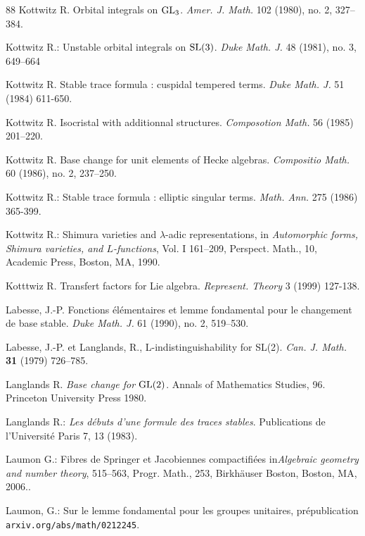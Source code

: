 \documentclass[12pt,english]{smfart}
\numberwithin{equation}{subsection}
\theoremstyle{remark}
\begin{document}
\begin{thebibliography}{88}
 Kottwitz R. Orbital integrals on ${\rm GL}\sb{3}$.
{\em Amer. J. Math.}  102  (1980), no. 2, 327--384.

 Kottwitz R.: {Unstable orbital integrals on ${\rm SL}(3)$}.
{\em Duke Math. J.} 48 (1981), no. 3, 649--664

 Kottwitz R. {Stable trace formula : cuspidal
tempered terms}. {\em Duke Math. J.} 51 (1984) 611-650.

 Kottwitz R. {Isocristal with additionnal
structures}. {\em Composotion Math.} 56 (1985) 201--220.

 Kottwitz R. {Base change for unit elements of Hecke algebras}.
{\em Compositio Math.} 60 (1986), no. 2, 237--250.

 Kottwitz R.: {Stable trace formula : elliptic
singular terms}. {\em Math. Ann.} 275 (1986) 365-399.

 Kottwitz R.: {Shimura varieties and $\lambda$-adic
representations}, in  {\em Automorphic forms, Shimura varieties, and
$L$-functions}, Vol. I 161--209, Perspect. Math., 10, Academic
Press, Boston, MA, 1990.

 Kotttwiz R. {Transfert factors for Lie algebra}.
{\em Represent. Theory} 3 (1999) 127-138.

 Labesse, J.-P. Fonctions \'el\'ementaires et lemme
    fondamental pour le changement de base stable. {\em Duke Math. J.}  61
    (1990),  no. 2, 519--530.

 Labesse, J.-P. et Langlands, R.,
{L-indistinguishability for SL(2)}. \emph{Can. J. Math.} \textbf{31}
(1979) 726--785.

 Langlands R. {\em Base change for ${\rm GL}(2)$}.
Annals of Mathematics Studies, 96. Princeton University Press 1980.

 Langlands R.: {\em Les d\'ebuts d'une formule des
    traces stables}. {Publications de l'Universit\'e Paris 7}, 13 (1983).

 Laumon G.: {Fibres de Springer et Jacobiennes compactifi\'ees}
    in{\em Algebraic geometry and number theory}, 515--563, Progr. Math.,
    253, Birkh\"{a}user Boston, Boston, MA, 2006..

 Laumon, G.: {Sur le lemme fondamental pour les groupes
    unitaires}, pr\'epublication {\tt arxiv.org/abs/math/0212245}.


\end{thebibliography}
\end{document}
